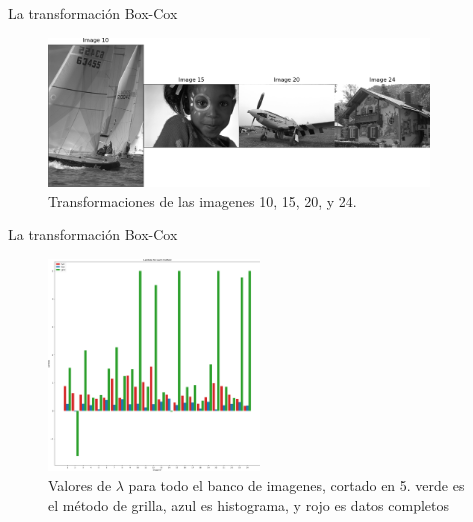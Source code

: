 \documentclass{beamer}
\begin{document}
\begin{frame}{La transformación Box-Cox}
    \begin{figure}[H]
        \centering
        \includegraphics[width=0.9\textwidth]{img_ex_10_15_20_24.png}
        \caption{Transformaciones de las imagenes 10, 15, 20, y 24.}
        \label{fig:img_bci_10_15_20}
    \end{figure}
\end{frame}

\begin{frame}{La transformación Box-Cox}
    \begin{figure}[H]
        \centering
        \includegraphics[width=0.5\textwidth]{lambda_clip.png}
        \caption{Valores de $\lambda$ para todo el banco de imagenes, cortado en 5. verde es el m\'etodo de grilla, azul es histograma, y rojo es datos completos}
        \label{fig:lambda_clip}
    \end{figure}
\end{frame}
\end{document}
